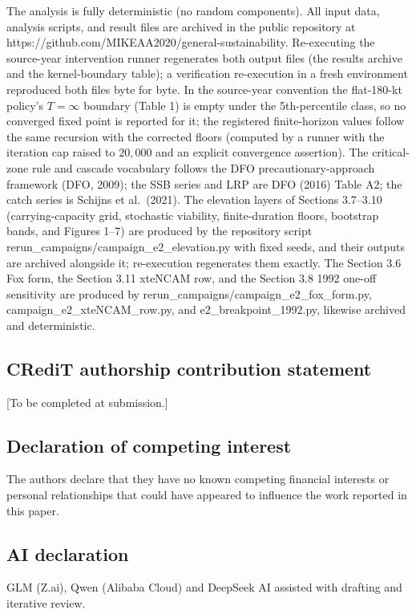 \documentclass[11pt]{article}
\begin{document}
The analysis is fully deterministic (no random components). All input
data, analysis scripts, and result files are archived in the public
repository at https://github.com/MIKEAA2020/general-sustainability.
Re-executing the source-year intervention runner regenerates both output
files (the results archive and the kernel-boundary table); a
verification re-execution in a fresh environment reproduced both files
byte for byte. In the source-year convention the flat-180-kt policy's
\(T=\infty\) boundary (Table 1) is empty under the 5th-percentile class,
so no converged fixed point is reported for it; the registered
finite-horizon values follow the same recursion with the corrected
floors (computed by a runner with the iteration cap raised to
\(20{,}000\) and an explicit convergence assertion). The critical-zone
rule and cascade vocabulary follows the DFO precautionary-approach
framework (DFO, 2009); the SSB series and LRP are DFO (2016) Table A2;
the catch series is Schijns et al.~(2021). The elevation layers of
Sections 3.7--3.10 (carrying-capacity grid, stochastic viability,
finite-duration floors, bootstrap bands, and Figures 1--7) are produced
by the repository script rerun\_campaigns/campaign\_e2\_elevation.py
with fixed seeds, and their outputs are archived alongside it;
re-execution regenerates them exactly. The Section 3.6 Fox form, the
Section 3.11 xteNCAM row, and the Section 3.8 1992 one-off sensitivity
are produced by rerun\_campaigns/campaign\_e2\_fox\_form.py,
campaign\_e2\_xteNCAM\_row.py, and e2\_breakpoint\_1992.py, likewise
archived and deterministic.

\subsection*{CRediT authorship contribution statement}

{[}To be completed at submission.{]}

\subsection*{Declaration of competing interest}

The authors declare that they have no known competing financial
interests or personal relationships that could have appeared to
influence the work reported in this paper.

\subsection*{AI declaration}
GLM (Z.ai), Qwen (Alibaba Cloud) and DeepSeek AI assisted with drafting and iterative review.
\end{document}
